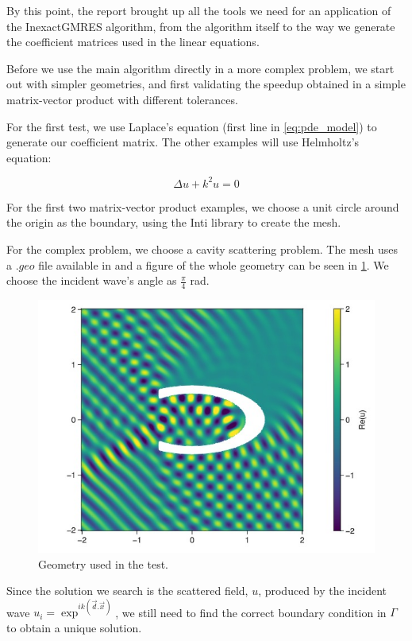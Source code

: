
By this point, the report brought up all the tools we need for an application of the InexactGMRES algorithm, from the algorithm itself to the way we generate the coefficient matrices used in the linear equations.

Before we use the main algorithm directly in a more complex problem, we start out with simpler geometries, and first validating the speedup obtained in a simple matrix-vector product with different tolerances.

For the first test, we use Laplace's equation (first line in \ref{eq:pde_model}) to generate our coefficient matrix. The other examples will use Helmholtz's equation:

\begin{equation}\label{eq:helmholtz}
    \Delta u + k^{2}u = 0
\end{equation}

For the first two matrix-vector product examples, we choose a unit circle around the origin as the boundary, using the Inti library \cite{git-inti} to create the mesh.


For the complex problem, we choose a cavity scattering problem. The mesh uses a $.geo$ file
available in \cite{git_dudu} and a figure of the whole geometry can be seen in \ref{fig:cavity_fig}. We choose the incident wave's angle as $\frac{\pi}{4}$ rad.

\begin{figure}[h!]
    \centering
    \includegraphics[width=0.6\linewidth]{images/cavity_fig.jpg}
    \caption{Geometry used in the test.}
    \label{fig:cavity_fig}
\end{figure}


Since the solution we search is the scattered field, $u$, produced by the incident wave $u_{i} = \exp^{ik(\vec{d}.\vec{x})}$, we still need to find the correct boundary condition in $\Gamma$ to obtain a unique solution.


